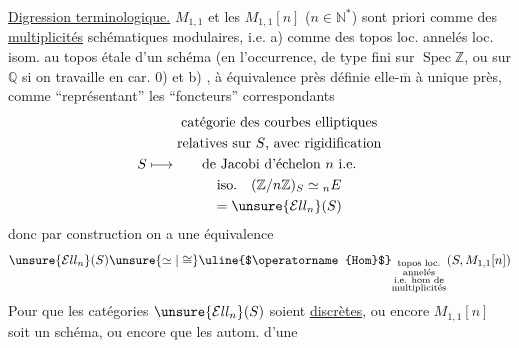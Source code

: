 \uline{Digression terminologique.} $M_{1,1}$  et les
$M_{1,1}[n]$ ($n\in\mathbb N^*$) sont   priori comme des \uline{multiplicités} schématiques modulaires, i.e. a) comme des topos loc. annelés loc. isom. au topos étale d'un schéma (en l'occurrence, de type fini sur $\operatorname{Spec}\mathbb Z$, ou sur $\mathbb Q$ si on travaille en car. 0) et b) , à équivalence près définie elle-$\overline{\mathrm m}$ à  unique près, comme ``représentant'' les  ``foncteurs'' correspondants
\[
S\longmapsto
\begin{gathered}
\text{catégorie des courbes elliptiques}\\
\text{relatives sur }S\text{, avec rigidification}\\
\text{de Jacobi d'échelon }n\text{ i.e.}\\
\text{iso.}\quad(\mathbb Z/n\mathbb Z)_S\simeq{}_nE\\
={}\unsure{\mathcal{E}ll_n}(S)
\end{gathered}
\]
donc par construction on a  une équivalence
\[
\unsure{\mathcal{E}ll_n}(S)\unsure{\simeq|\cong}
\text{\uline{$\operatorname{Hom}$}}_{\substack{\text{topos loc.}\\\text{annelés}\\\text{i.e. hom de}\\\text{multiplicités}}}
(S,M_{1,1}[n])
\]
Pour que les catégories $\unsure{\mathcal{E}ll_n}(S)$ soient \uline{discrètes},  ou encore $M_{1,1}[n]$ soit un schéma, ou encore que les autom. d'une

